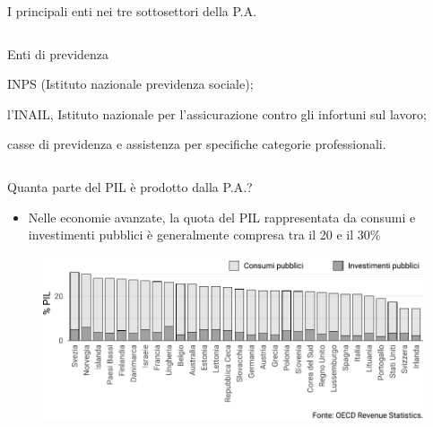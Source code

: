 \documentclass[aspectratio=64,11pt]{beamer}
\newenvironment{nobulletlist}{\begin{list}{--}{\itemsep=3pt\itemindent=2ex\labelsep=.7ex\leftmargin=0pt}}{\end{list}}
\begin{document}
\begin{frame}{I principali enti nei tre sottosettori della P.A.}
\begin{columns}[t]
\begin{column}{.33\columnwidth}
\begin{block}{\footnotesize Enti di previdenza}
\begin{nobulletlist}
\item INPS (Istituto nazionale previdenza sociale);
\item l’INAIL, Istituto nazionale per l’assicurazione contro gli infortuni sul la\-voro;
\item casse di previdenza e assistenza per specifiche categorie professio\-nali.
\end{nobulletlist}
\end{block}
\end{column}
\end{columns}
\end{frame}

\begin{frame}{Quanta parte del PIL è prodotto dalla P.A.?}
\begin{itemize}
\item Nelle economie avanzate, la quota del PIL rappresentata da consumi e
investimenti pubblici è generalmente compresa tra il 20 e il 30\%
\end{itemize}

\begin{figure}
\centering
\includegraphics[width=.9\textwidth]{./figure/consumi-investimenti-pubblici-PIL.pdf}
\end{figure}
\end{frame}
\end{document}
